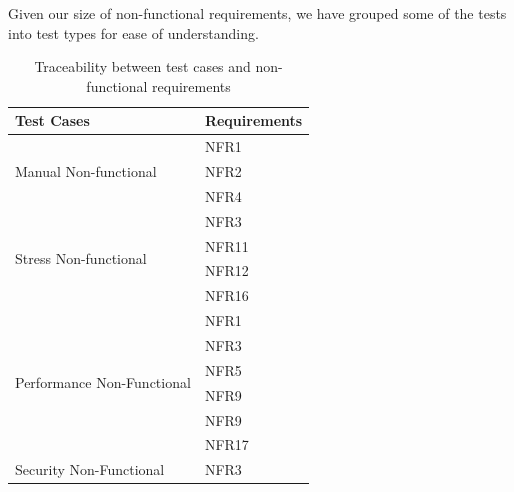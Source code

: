 \documentclass[12pt, titlepage]{article}
\begin{document}
\noindent Given our size of non-functional requirements, we have grouped some of the tests into test types for ease of understanding.
\begin{table}[H]
  \centering
  \caption{Traceability between test cases and non-functional requirements }
  \label{tab:my-table}
  \begin{tabular}{|l|l|}
  \hline
  \textbf{Test Cases}                         & \textbf{Requirements} \\ \hline
  \multirow{3}{*}{Manual Non-functional}      & NFR1                  \\ \cline{2-2} 
                                              & NFR2                  \\ \cline{2-2} 
                                              & NFR4                  \\ \hline
  \multirow{4}{*}{Stress Non-functional}      & NFR3                  \\ \cline{2-2} 
                                              & NFR11                 \\ \cline{2-2} 
                                              & NFR12                 \\ \cline{2-2} 
                                              & NFR16                 \\ \hline
  \multirow{6}{*}{Performance Non-Functional} & NFR1                  \\ \cline{2-2} 
                                              & NFR3                  \\ \cline{2-2} 
                                              & NFR5                  \\ \cline{2-2} 
                                              & NFR9                  \\ \cline{2-2} 
                                              & NFR9                  \\ \cline{2-2} 
                                              & NFR17                 \\ \hline
  Security Non-Functional                                   & NFR3                  \\ \hline
  \end{tabular}
\end{table}
\end{document}
